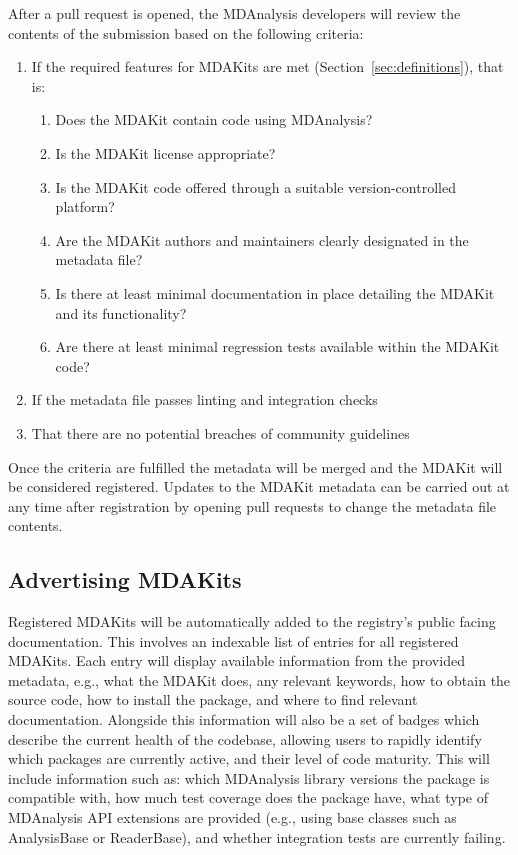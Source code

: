 \documentclass[9pt,whitepaper]{livecoms}
\begin{document}
After a pull request is opened, the MDAnalysis developers will review the contents of the submission based on the following criteria:
\begin{enumerate}
    \item If the required features for MDAKits are met (Section~\ref{sec:definitions}), that is:
    \begin{enumerate}
        \item Does the MDAKit contain code using MDAnalysis?
        \item Is the MDAKit license appropriate?
        \item Is the MDAKit code offered through a suitable version-controlled platform?
        \item Are the MDAKit authors and maintainers clearly designated in the metadata file?
        \item Is there at least minimal documentation in place detailing the MDAKit and its functionality?
        \item Are there at least minimal regression tests available within the MDAKit code?
    \end{enumerate}
    \item If the metadata file passes linting and integration checks
    \item That there are no potential breaches of community guidelines
\end{enumerate}
Once the criteria are fulfilled the metadata will be merged and the MDAKit will be considered registered. Updates to the MDAKit metadata can be carried out at any time after registration by opening pull requests to change the metadata file contents.

\subsection{Advertising MDAKits}
\label{sec:advertising}

Registered MDAKits will be automatically added to the registry’s public facing documentation. This involves an indexable list of entries for all registered MDAKits. Each entry will display available information from the provided metadata, e.g., what the MDAKit does, any relevant keywords, how to obtain the source code, how to install the package, and where to find relevant documentation. Alongside this information will also be a set of badges which describe the current health of the codebase, allowing users to rapidly identify which packages are currently active, and their level of code maturity. This will include information such as: which MDAnalysis library versions the package is compatible with, how much test coverage does the package have, what type of MDAnalysis API extensions are provided (e.g., using base classes such as AnalysisBase or ReaderBase), and whether integration tests are currently failing.
\end{document}
